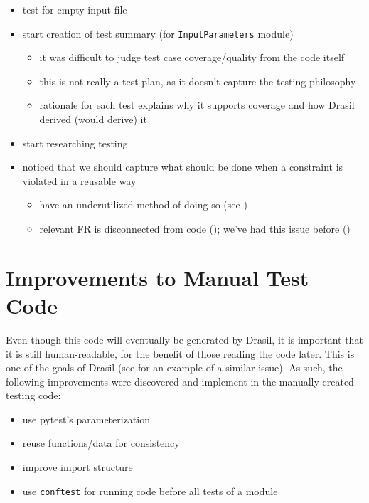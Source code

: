 \begin{itemize}
    \item test for empty input file
    \item start creation of test summary (for \texttt{InputParameters} module)
          \begin{itemize}
              \item it was difficult to judge test case coverage/quality from
                    the code itself
              \item this is not really a test plan, as it doesn't capture the
                    testing philosophy
              \item rationale for each test explains why it supports coverage
                    and how Drasil derived (would derive) it
          \end{itemize}
    \item start researching testing
    \item noticed that we should capture what should be done when a constraint
          is violated in a reusable way
          \begin{itemize}
              \item have an underutilized method of doing so (see )
              \item relevant FR is disconnected from code (); we've had
                    this issue before ()
          \end{itemize}
\end{itemize}

\section{Improvements to Manual Test Code}

Even though this code will eventually be generated by Drasil, it is important
that it is still human-readable, for the benefit of those reading the code
later. This is one of the goals of Drasil (see  for an example
of a similar issue). As such, the following improvements were discovered and
implement in the manually created testing code:

\begin{itemize}
    \item use pytest's parameterization
    \item reuse functions/data for consistency
    \item improve import structure
    \item use \texttt{conftest} for running code before all tests of a module
\end{itemize}

